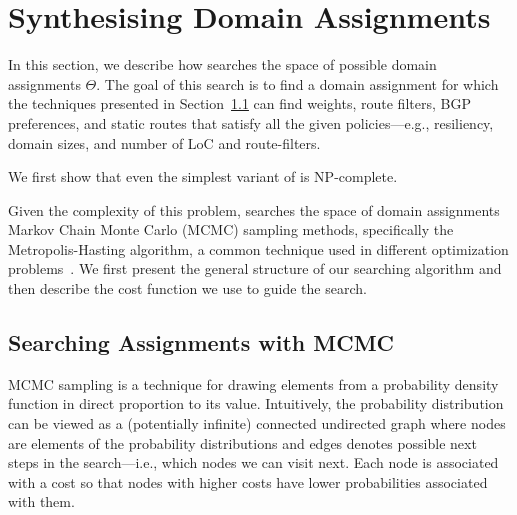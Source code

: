 \section{Synthesising Domain Assignments}
\label{sec:synth-dom-ass}

In this section, we describe how \name searches the space of possible
domain assignments $\Theta$.
The goal of this search is to find a domain assignment for which
the techniques presented in Section~\ref{} can find weights, route filters,
BGP preferences, and static routes that satisfy all the given  policies---e.g.,
resiliency, domain sizes, and number of LoC and route-filters.

We first show that even the simplest variant of  is NP-complete.
\begin{theorem}
\end{theorem}
Given the complexity of this problem, \name  searches the space of domain
assignments Markov
Chain Monte Carlo (MCMC) sampling methods, specifically the Metropolis-Hasting
algorithm, a common technique used in different optimization 
problems~\cite{stoke}. 
We first present the general structure of our searching algorithm and 
then describe the cost function we use to guide the search.

\subsection{Searching Assignments with MCMC}
MCMC sampling is a technique for 
drawing elements from a
probability density function in direct proportion to its value.
Intuitively, the probability distribution can be viewed as a (potentially infinite) 
connected undirected graph
where nodes are elements of the probability distributions
and edges denotes possible next steps in the search---i.e.,
which nodes we can visit next.
Each node is associated with a cost so that nodes with higher costs have lower
probabilities associated with them.

